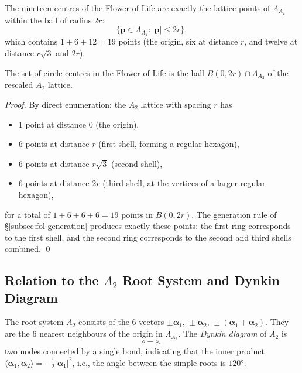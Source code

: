 The nineteen centres of the Flower of Life are exactly the lattice points
of \(\Lambda_{A_2}\) within the ball of radius \(2r\):
\[
  \{\mathbf{p}\in\Lambda_{A_2} : |\mathbf{p}|\le 2r\},
\]
which contains \(1+6+12=19\) points (the origin, six at distance \(r\),
and twelve at distance \(r\sqrt{3}\) and \(2r\)).

\begin{proposition}
\label{prop:fol-a2}
The set of circle-centres in the Flower of Life is the ball
\(B(0,2r)\cap\Lambda_{A_2}\) of the rescaled \(A_2\) lattice.
\end{proposition}
\begin{proof}
By direct enumeration: the \(A_2\) lattice with spacing \(r\) has
\begin{itemize}
  \item 1 point at distance 0 (the origin),
  \item 6 points at distance \(r\) (first shell, forming a regular hexagon),
  \item 6 points at distance \(r\sqrt{3}\) (second shell),
  \item 6 points at distance \(2r\) (third shell, at the vertices of a larger
        regular hexagon),
\end{itemize}
for a total of \(1+6+6+6=19\) points in \(B(0,2r)\).  The generation
rule of §\ref{subsec:fol-generation} produces exactly these points:
the first ring corresponds to the first shell, and the second ring
corresponds to the second and third shells combined.  \qed
\end{proof}

\subsection{Relation to the \(A_2\) Root System and Dynkin Diagram}
\label{subsec:fol-dynkin}

The root system \(A_2\) consists of the 6 vectors
\(\pm\boldsymbol{\alpha}_1,\,\pm\boldsymbol{\alpha}_2,\,
\pm(\boldsymbol{\alpha}_1+\boldsymbol{\alpha}_2)\).
They are the 6 nearest neighbours of the origin in \(\Lambda_{A_2}\).
The \emph{Dynkin diagram} of \(A_2\) is
\[
  \circ\!\!-\!\!\circ,
\]
two nodes connected by a single bond, indicating that the inner product
\(\langle\boldsymbol{\alpha}_1,\boldsymbol{\alpha}_2\rangle = -\frac{1}{2}
|\boldsymbol{\alpha}_1|^2\), i.e., the angle between the simple roots is
\(120°\).

